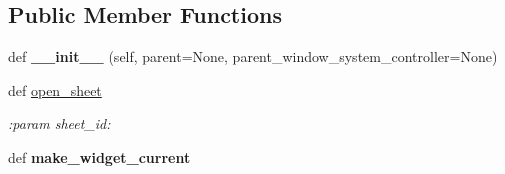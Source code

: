 \subsection*{Public Member Functions}
\begin{DoxyCompactItemize}
\item 
def {\bfseries \+\_\+\+\_\+init\+\_\+\+\_\+} (self, parent=None, parent\+\_\+window\+\_\+system\+\_\+controller=None)\hypertarget{classplume-creator_1_1src_1_1plume_1_1gui_1_1write__panel_1_1_write_panel_a313d5647e5794b2ea98b7a7d4adf2d77}{}\label{classplume-creator_1_1src_1_1plume_1_1gui_1_1write__panel_1_1_write_panel_a313d5647e5794b2ea98b7a7d4adf2d77}

\item 
def \hyperlink{classplume-creator_1_1src_1_1plume_1_1gui_1_1write__panel_1_1_write_panel_aa2678eeda23e67a99682a7970a676ccf}{open\+\_\+sheet}\hypertarget{classplume-creator_1_1src_1_1plume_1_1gui_1_1write__panel_1_1_write_panel_aa2678eeda23e67a99682a7970a676ccf}{}\label{classplume-creator_1_1src_1_1plume_1_1gui_1_1write__panel_1_1_write_panel_aa2678eeda23e67a99682a7970a676ccf}

\begin{DoxyCompactList}\small\item\em \+:param sheet\+\_\+id\+: \end{DoxyCompactList}\item 
def {\bfseries make\+\_\+widget\+\_\+current}\hypertarget{classplume-creator_1_1src_1_1plume_1_1gui_1_1write__panel_1_1_write_panel_a3d8676c527bebfe1a5828238aaca6a77}{}\label{classplume-creator_1_1src_1_1plume_1_1gui_1_1write__panel_1_1_write_panel_a3d8676c527bebfe1a5828238aaca6a77}

\end{DoxyCompactItemize}
